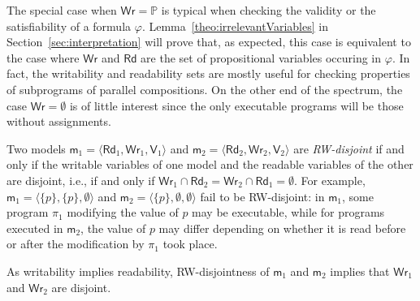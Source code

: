 \documentclass{llncs}
\newcommand{\modl}{\mathsf m}
\newcommand{\readset}{\mathsf{Rd}}
\newcommand{\valuset}{\mathsf{V}}
\newcommand{\writeset}{\mathsf{Wr}}
\renewcommand{\phi}{\varphi}
\newcommand{\propset}{\mathbb P}
\newcommand{\set}[1]{\{#1\}}
\newcommand{\tuple}[1]{ \langle #1 \rangle}
\begin{document}
The special case when $\writeset = \propset$ is typical when checking the validity or the satisfiability of a formula $\phi$.
Lemma~\ref{theo:irrelevantVariables} in Section~\ref{sec:interpretation} will prove that,
as expected, this case is equivalent to the case where $\writeset$ and $\readset$ are the set of propositional variables occuring in $\phi$.
In fact, the writability and readability sets are mostly useful for checking properties of subprograms of parallel compositions.
On the other end of the spectrum, the case $\writeset = \emptyset$ is of little interest since the only executable programs will be those without assignments.

Two models 
$\modl_1 = \tuple{\readset_1,\writeset_1,\valuset_1}$ and 
$\modl_2 = \tuple{\readset_2,\writeset_2,\valuset_2}$ are \emph{RW-disjoint} 
if and only if the writable variables of one model and the readable variables of the other are disjoint, i.e., 
if and only if $\writeset_1 \cap \readset_2  = \writeset_2 \cap \readset_1  = \emptyset $. 
For example, 
$\modl_1 = \tuple{ \set p , \set p , \emptyset}$ and 
$\modl_2 = \tuple{ \set p , \emptyset , \emptyset}$ fail to be RW-disjoint:
in $\modl_1$, some program $\pi_1$ modifying the value of $p$ may be executable, while 
for programs executed in $\modl_2$, the value of $p$ %
may differ depending on whether it is read 
before or after the modification by $\pi_1$ took place. 

As writability implies readability, %
RW-disjointness of $\modl_1$ and $\modl_2$ implies that
$\writeset_1$ and $\writeset_2$ are disjoint. 
\end{document}
